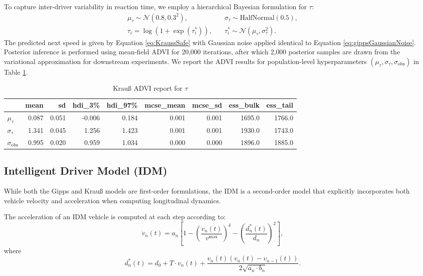 \documentclass[journal]{IEEEtran}
\begin{document}
To capture inter-driver variability in reaction time, we employ a hierarchical Bayesian formulation for $\tau$:
\begin{align*}
    \mu_\tau\sim\mathcal{N}(0.8, 0.3^2),&\quad \sigma_\tau\sim\text{HalfNormal}(0.5), \\
    \tau_i=\log(1+\exp(\tau_i^{*})),&\quad \tau_i^{*}\sim\mathcal{N}(\mu_\tau ,\sigma_\tau^{2}).
\end{align*}
The predicted next speed is given by Equation \ref{eq:KraussSafe} with Gaussian noise applied identical to Equation \ref{eq:gippsGaussianNoise}. Posterior inference is performed using mean-field ADVI for 20,000 iterations, after which 2,000 posterior samples are drawn from the variational approximation for downstream experiments. We report the ADVI results for population-level hyperparameters $(\mu_\tau,\sigma_\tau,\sigma_{\text{obs}})$ in Table \ref{tab:Krauss}.
\begin{table}[th]
    \centering
    \caption{Krau{\ss} ADVI report for $\tau$}
    \label{tab:Krauss}
    \begin{tabular}{lrrrrrrrr}
        \toprule
        {} & mean & sd & hdi\_3\% & hdi\_97\% & mcse\_mean & mcse\_sd & ess\_bulk & ess\_tail \\
        \midrule
        $\mu_\tau$   & 0.087 & 0.051 & -0.006 & 0.184 & 0.001 & 0.001 & 1695.0 & 1766.0 \\
        $\sigma_\tau$ & 1.341 & 0.045 & 1.256 & 1.423 & 0.001 & 0.001 & 1930.0 & 1743.0 \\
        $\sigma_{\text{obs}}$ & 0.995 & 0.020 & 0.959 & 1.034 & 0.000 & 0.000 & 1896.0 & 1885.0 \\
        \bottomrule
    \end{tabular}
\end{table}

\subsection{Intelligent Driver Model (IDM)}\label{subsec:idm}

While both the Gipps and Krau{\ss} models are first-order formulations, the IDM is a second-order model that explicitly incorporates both vehicle velocity and acceleration when computing longitudinal dynamics.

The acceleration of an IDM vehicle is computed at each step according to:
\begin{equation}\label{eq:IDMAcc}
    \dot{v}_n(t) = a_n\left[1-\left(\frac{v_n(t)}{v^{\max}}\right)^{\delta}-\left(\frac{d_n^*(t)}{d_n}\right)^2\right],
\end{equation}
where
\begin{equation}\label{eq:IDMDist}
    d_n^*(t)=d_0 + T\cdot v_n(t) + \frac{v_n(t)(v_n(t)-v_{n-1}(t))}{2\sqrt{a_n\cdot b_n}}.
\end{equation}
\end{document}
